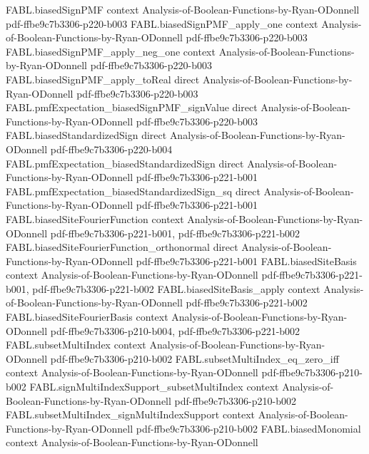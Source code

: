 \begin{theorem}
\proofstep
  {FABL.biasedSignPMF}
  {context}
  {Analysis-of-Boolean-Functions-by-Ryan-ODonnell}
  {pdf-ffbe9c7b3306-p220-b003}
\proofstep
  {FABL.biasedSignPMF_apply_one}
  {context}
  {Analysis-of-Boolean-Functions-by-Ryan-ODonnell}
  {pdf-ffbe9c7b3306-p220-b003}
\proofstep
  {FABL.biasedSignPMF_apply_neg_one}
  {context}
  {Analysis-of-Boolean-Functions-by-Ryan-ODonnell}
  {pdf-ffbe9c7b3306-p220-b003}
\proofstep
  {FABL.biasedSignPMF_apply_toReal}
  {direct}
  {Analysis-of-Boolean-Functions-by-Ryan-ODonnell}
  {pdf-ffbe9c7b3306-p220-b003}
\proofstep
  {FABL.pmfExpectation_biasedSignPMF_signValue}
  {direct}
  {Analysis-of-Boolean-Functions-by-Ryan-ODonnell}
  {pdf-ffbe9c7b3306-p220-b003}
\proofstep
  {FABL.biasedStandardizedSign}
  {direct}
  {Analysis-of-Boolean-Functions-by-Ryan-ODonnell}
  {pdf-ffbe9c7b3306-p220-b004}
\proofstep
  {FABL.pmfExpectation_biasedStandardizedSign}
  {direct}
  {Analysis-of-Boolean-Functions-by-Ryan-ODonnell}
  {pdf-ffbe9c7b3306-p221-b001}
\proofstep
  {FABL.pmfExpectation_biasedStandardizedSign_sq}
  {direct}
  {Analysis-of-Boolean-Functions-by-Ryan-ODonnell}
  {pdf-ffbe9c7b3306-p221-b001}
\proofstep
  {FABL.biasedSiteFourierFunction}
  {context}
  {Analysis-of-Boolean-Functions-by-Ryan-ODonnell}
  {pdf-ffbe9c7b3306-p221-b001,
    pdf-ffbe9c7b3306-p221-b002}
\proofstep
  {FABL.biasedSiteFourierFunction_orthonormal}
  {direct}
  {Analysis-of-Boolean-Functions-by-Ryan-ODonnell}
  {pdf-ffbe9c7b3306-p221-b001}
\proofstep
  {FABL.biasedSiteBasis}
  {context}
  {Analysis-of-Boolean-Functions-by-Ryan-ODonnell}
  {pdf-ffbe9c7b3306-p221-b001,
    pdf-ffbe9c7b3306-p221-b002}
\proofstep
  {FABL.biasedSiteBasis_apply}
  {context}
  {Analysis-of-Boolean-Functions-by-Ryan-ODonnell}
  {pdf-ffbe9c7b3306-p221-b002}
\proofstep
  {FABL.biasedSiteFourierBasis}
  {context}
  {Analysis-of-Boolean-Functions-by-Ryan-ODonnell}
  {pdf-ffbe9c7b3306-p210-b004,
    pdf-ffbe9c7b3306-p221-b002}
\proofstep
  {FABL.subsetMultiIndex}
  {context}
  {Analysis-of-Boolean-Functions-by-Ryan-ODonnell}
  {pdf-ffbe9c7b3306-p210-b002}
\proofstep
  {FABL.subsetMultiIndex_eq_zero_iff}
  {context}
  {Analysis-of-Boolean-Functions-by-Ryan-ODonnell}
  {pdf-ffbe9c7b3306-p210-b002}
\proofstep
  {FABL.signMultiIndexSupport_subsetMultiIndex}
  {context}
  {Analysis-of-Boolean-Functions-by-Ryan-ODonnell}
  {pdf-ffbe9c7b3306-p210-b002}
\proofstep
  {FABL.subsetMultiIndex_signMultiIndexSupport}
  {context}
  {Analysis-of-Boolean-Functions-by-Ryan-ODonnell}
  {pdf-ffbe9c7b3306-p210-b002}
\proofstep
  {FABL.biasedMonomial}
  {context}
  {Analysis-of-Boolean-Functions-by-Ryan-ODonnell}

\end{theorem}
